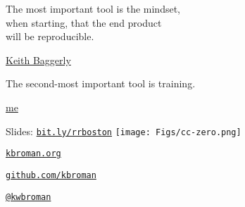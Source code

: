 \documentclass[aspectratio=169,12pt,t]{beamer}
\begin{document}
\begin{frame}[c]{}

\begin{center}
\large
The most important tool is the {\hilit mindset},\\
when starting, that the end product \\
will be reproducible.
\end{center}

\hfill
{\lolit
{\textendash} \href{https://odin.mdacc.tmc.edu/~kabaggerly/}{Keith Baggerly}
}

\end{frame}




\begin{frame}[c]{}

\begin{center}
\large
The second-most important tool is {\hilit training}.
\end{center}

\vspace*{12mm}

\hfill
{\lolit
{\textendash} \href{https://kbroman.org}{me} \hspace*{20mm}
}

\end{frame}




\begin{frame}[c]{}

\Large

Slides: \href{https://bit.ly/rrboston}{\tt bit.ly/rrboston} \quad
\texttt{[image: Figs/cc-zero.png]}

\vspace{10mm}

\href{https://kbroman.org}{\tt kbroman.org}

\vspace{10mm}

\href{https://github.com/kbroman}{\tt github.com/kbroman}

\vspace{10mm}

\href{https://twitter.com/kwbroman}{\tt @kwbroman}


\end{frame}
\end{document}
